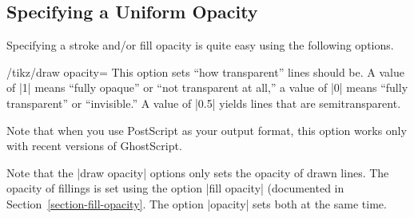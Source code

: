 \subsection{Specifying a Uniform Opacity}

Specifying a stroke and/or fill opacity is quite easy using the
following options.


\begin{key}{/tikz/draw opacity=}
  This option sets ``how transparent'' lines should be. A value of |1|
  means ``fully opaque'' or ``not transparent at all,'' a value of |0|
  means ``fully transparent'' or ``invisible.'' A value of |0.5|
  yields lines that are semitransparent.

  Note that when you use PostScript as your output format,
  this option works only with recent versions of GhostScript.
   
\begin{codeexample}[]
\end{codeexample}
\end{key}

Note that the |draw opacity| options only sets the opacity of drawn
lines. The opacity of fillings is set using the option
|fill opacity| (documented in Section~\ref{section-fill-opacity}. The
option |opacity| sets both at the same time. 

